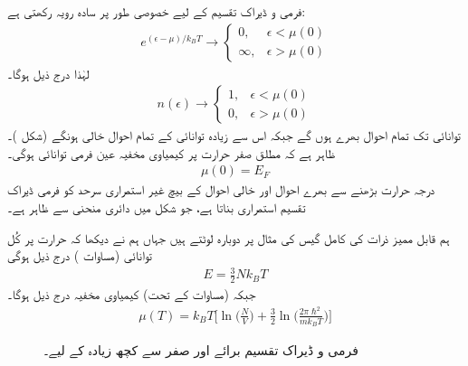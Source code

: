  فرمی و ڈیراک تقسیم  کے لیے خصوصی طور پر سادہ رویہ رکھتی ہے: 
\begin{align*}
e^{(\epsilon - \mu)/k_B T} \to
\begin{cases}
0 , & \epsilon < \mu (0) \\
\infty , & \epsilon > \mu (0)
\end{cases}
\end{align*}
لہٰذا درج ذیل ہوگا۔
\begin{align}
n(\epsilon) \to
\begin{cases}
1, & \epsilon < \mu (0) \\
0, & \epsilon > \mu (0)
\end{cases}
\end{align}
توانائی  تک تمام احوال بھرے ہوں گے جبکہ اس سے زیادہ توانائی کے تمام احوال خالی ہونگے (شکل )۔ ظاہر ہے کہ مطلق صفر حرارت پر کیمیاوی مخفیہ عین فرمی توانائی ہوگی۔ 
\begin{align}
\mu (0) = E_F
\end{align}
درجہ حرارت بڑھنے سے بھرے احوال اور خالی احوال کے بیچ غیر استمراری سرحد کو فرمی ڈیراک تقسیم استمراری بناتا ہے، جو شکل  میں دائری منحنی سے ظاہر ہے۔ 

ہم قابل ممیز ذرات کی کامل گیس کی مثال پر دوبارہ لوٹتے ہیں جہاں ہم نے دیکھا کہ حرارت  پر کُل توانائی (مساوات ) درج ذیل ہوگی 
\begin{align}
E = \frac{3}{2} N k_B T
\end{align}
جبکہ (مساوات  کے تحت) کیمیاوی مخفیہ درج ذیل ہوگا۔
\begin{align}
\mu (T) = k_B T \big [ \ln\big( \frac{N}{V} \big) + \frac{3}{2} \ln\big ( \frac{2 \pi \hslash^2}{m k_B T} \big ) \big ]
\end{align}

\begin{figure}
\centering
{}
\caption{فرمی و ڈیراک تقسیم برائے  اور صفر سے کچھ زیادہ  کے لیے۔}
\label{شکل_متماثل_فرمی_ڈیراک_تقسیم}
\end{figure}

